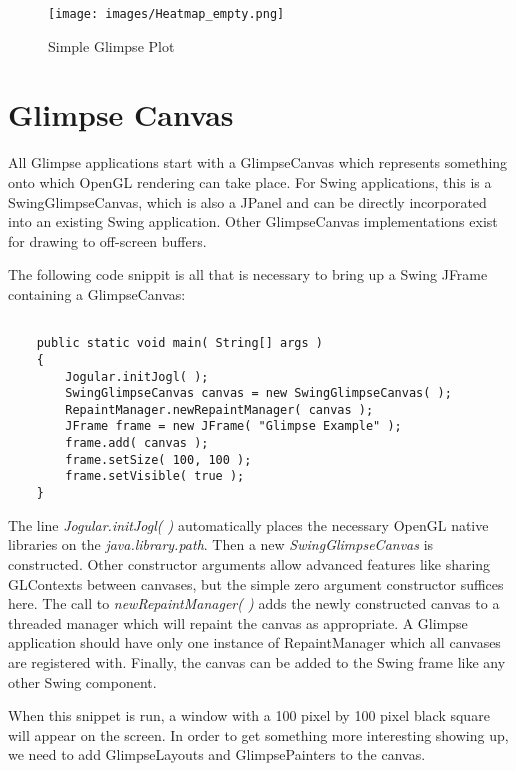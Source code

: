 \documentclass[12pt]{article}
\begin{document}
\begin{figure}
  \centering
    \texttt{[image: images/Heatmap\_empty.png]}
  \caption{Simple Glimpse Plot}
\label{simpleplot}
\end{figure}

\section{Glimpse Canvas}

All Glimpse applications start with a GlimpseCanvas which represents something onto which OpenGL rendering can take place. For Swing applications, this is a SwingGlimpseCanvas, which is also a JPanel and can be directly incorporated into an existing Swing application. Other GlimpseCanvas implementations exist for drawing to off-screen buffers.

The following code snippit is all that is necessary to bring up a Swing JFrame containing a GlimpseCanvas:

\begin{samepage}
\begin{verbatim}

    public static void main( String[] args )
    {
        Jogular.initJogl( );
        SwingGlimpseCanvas canvas = new SwingGlimpseCanvas( );
        RepaintManager.newRepaintManager( canvas );
        JFrame frame = new JFrame( "Glimpse Example" );
        frame.add( canvas );
        frame.setSize( 100, 100 );
        frame.setVisible( true );
    }

\end{verbatim}
\end{samepage}

The line \emph{Jogular.initJogl( )} automatically places the necessary OpenGL native libraries on the \emph{java.library.path}. Then a new \emph{SwingGlimpseCanvas} is constructed. Other constructor arguments allow advanced features like sharing GLContexts between canvases, but the simple zero argument constructor suffices here. The call to \emph{newRepaintManager( )} adds the newly constructed canvas to a threaded manager which will repaint the canvas as appropriate. A Glimpse application should have only one instance of RepaintManager which all canvases are registered with. Finally, the canvas can be added to the Swing frame like any other Swing component.

When this snippet is run, a window with a 100 pixel by 100 pixel black square will appear on the screen. In order to get something more interesting showing up, we need to add GlimpseLayouts and GlimpsePainters to the canvas.
\end{document}
